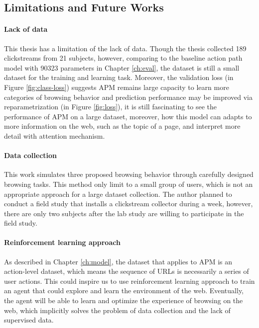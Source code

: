 \subsection{Limitations and Future Works}
\label{sec:limitations}

\paragraph{Lack of data} 
This thesis has a limitation of the lack of data. 
Though the thesis collected 189 clickstreams from 21 subjects, however, 
comparing to the baseline action path model with 90323 parameters in Chapter \ref{ch:eval},
the dataset is still a small dataset for the training and learning task.
Moreover, the validation loss (in Figure \ref{fig:class-loss}) suggests APM remains 
large capacity to learn more
categories of browsing behavior and prediction performance may be improved
via reparametrization (in Figure \ref{fig:loss}), 
it is still fascinating to see the performance of APM on a large dataset,
moreover, how this model can adapts to more information on the web, such as the topic of 
a page, and interpret more detail with attention mechanism.

\paragraph{Data collection}
This work simulates three proposed browsing behavior through carefully designed browsing tasks.
This method only limit to a small group of users, which is not an appropriate approach for
a large dataset collection.
The author planned to conduct a field study that installs a clickstream collector during a week, 
however, there are only two subjects after the lab study
are willing to participate in the field study.

\paragraph{Reinforcement learning approach}
As described in Chapter \ref{ch:model}, the dataset that applies to APM
is an action-level dataset, which means the sequence of URLs is necessarily a series of 
user actions. This could inspire us to use reinforcement learning approach to train
an agent that could explore and learn the environment of the web. Eventually,
the agent will be able to learn and optimize the experience of browsing on the web,
which implicitly solves the problem of data collection and the lack of supervised data.

